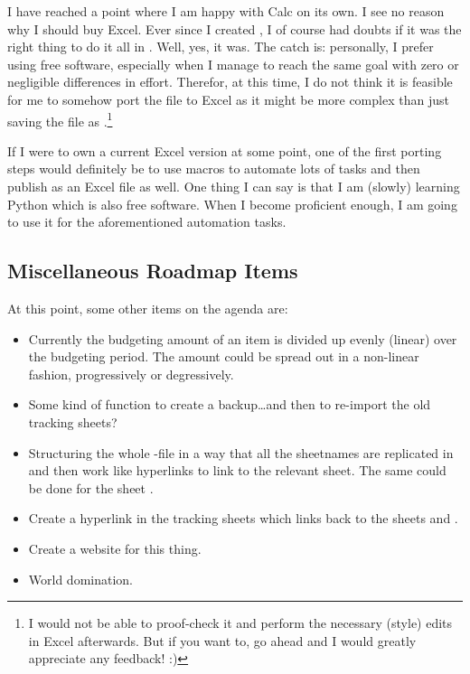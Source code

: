 I have reached a point where I am happy with Calc on its own.
I see no reason why I should buy Excel.
Ever since I created \tfn, I of course had doubts if it was the right thing to do it all in \loc.
Well, yes, it was.
The catch is: personally, I prefer using free software, especially when I manage to reach the same goal with zero or negligible differences in effort.
Therefor, at this time, I do not think it is feasible for me to somehow port the file to Excel as it might be more complex than just saving the file as .\footnote{I would not be able to proof-check it and perform the necessary (style) edits in Excel afterwards.
But if you want to, go ahead and I would greatly appreciate any feedback! :)}

If I were to own a current Excel version at some point, one of the first porting steps would definitely be to use macros to automate lots of tasks and then publish \tfn as an Excel file as well.
One thing I can say is that I am (slowly) learning Python which is also free software.
When I become proficient enough, I am going to use it for the aforementioned automation tasks.

\subsection{Miscellaneous Roadmap Items}
\label{subsec:misc-roadmap-items}

At this point, some other items on the agenda are:
\begin{itemize}
	\item Currently the budgeting amount of an item is divided up evenly (\ie linear) over the budgeting period.
	The amount could be spread out in a non-linear fashion, \eg progressively or degressively.
	\item Some kind of function to create a backup\ldots and then to re-import the old tracking sheets?
	\item Structuring the whole -file in a way that all the sheetnames are replicated in  and then work like hyperlinks to link to the relevant sheet.
	The same could be done for the sheet .
	\item Create a hyperlink in the tracking sheets which links back to the sheets  and .
	\item Create a website for this thing.
	\item World domination.
\end{itemize}

